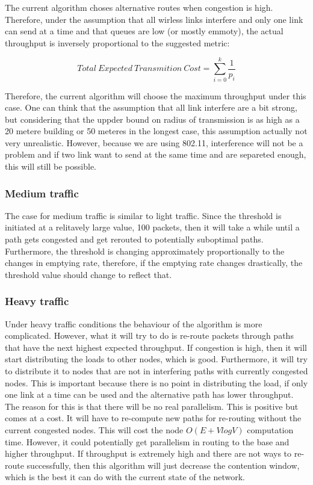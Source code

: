 \documentclass[letterpaper]{article}
\begin{document}
The current algorithm choses alternative routes when congestion is high. Therefore, under the assumption that all wirless links interfere and only one link can send at a time and that queues are low (or mostly emmoty), the actual throughput is inversely proportional to the suggested metric:

$$  Total \ Expected \ Transmition \ Cost = \sum_{i=0}^{k}\frac{1}{p_{i}}$$

Therefore, the current algorithm will choose the maximum throughput under this case. One can think that the assumption that all link interfere are a bit strong, but considering that the uppder bound on radius of transmission is as high as a 20 metere building or 50 meteres in the longest case, this assumption actually not very unrealistic. However, because we are using 802.11, interference will not be a problem and if two link want to send at the same time and are separeted enough, this will still be possible.

\subsubsection{Medium traffic}

The case for medium traffic is similar to light traffic. Since the threshold is initiated at a relitavely large value, 100 packets, then it will take a while until a path gets congested and get rerouted to potentially suboptimal paths. Furthermore, the threshold is changing approximately proportionally to the changes in emptying rate, therefore, if the emptying rate changes drastically, the threshold value should change to reflect that.

\subsubsection{Heavy traffic}

Under heavy traffic conditions the behaviour of the algorithm is more complicated. However, what it will try to do is re-route packets through paths that have the next highest expected throughput. If congestion is high, then it will start distributing the loads to other nodes, which is good. Furthermore, it will try to distribute it to nodes that are not in interfering paths with currently congested nodes. This is important because there is no point in distributing the load, if only one link at a time can be used and the alternative path has lower throughput. The reason for this is that there will be no real parallelism. This is positive but comes at a cost. It will have to re-compute new paths for re-routing without the current congested nodes. This will cost the node $O(E + VlogV)$ computation time. However, it could potentially get parallelism in routing to the base and higher throughput. If throughput is extremely high and there are not ways to re-route successfully, then this algorithm will just decrease the contention window, which is the best it can do with the current state of the network.
\end{document}
